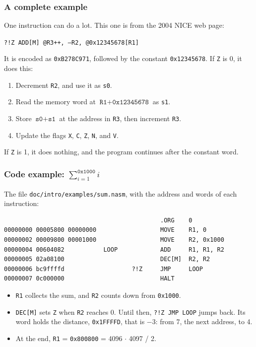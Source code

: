 \documentclass{beamer}
\newcommand{\code}[1]{\texttt{#1}}
\begin{document}
   \begin{frame}
    \frametitle{A complete example}
    One instruction can do a lot. This one is from the 2004 NICE web page:
    \begin{center}
     \code{?!Z ADD[M] @R3++, --R2, @0x12345678[R1]}
    \end{center}
    It is encoded as \code{0xB278C971}, followed by the constant
    \code{0x12345678}. If \code{Z} is 0, it does this:
    \begin{enumerate}
     \item Decrement \code{R2}, and use it as \code{s0}.
     \item Read the memory word at $\code{R1} + \code{0x12345678}$ as
      \code{s1}.
     \item Store $\code{s0} + \code{s1}$ at the address in \code{R3}, then
      increment \code{R3}.
     \item Update the flags \code{X}, \code{C}, \code{Z}, \code{N}, and
      \code{V}.
    \end{enumerate}
    If \code{Z} is 1, it does nothing, and the program continues after the
    constant word.
   \end{frame}
%
  \begin{frame}[fragile]
   \frametitle{Code example: {\scriptsize$\sum_{i=1}^{\mathtt{0x1000}}i$}}
   The file \code{doc/intro/examples/sum.nasm}, with the address and words
   of each instruction:
   {\scriptsize
   \begin{verbatim}
                                            .ORG    0
00000000 00005800 00000000                  MOVE    R1, 0
00000002 00009800 00001000                  MOVE    R2, 0x1000
00000004 00604082           LOOP            ADD     R1, R1, R2
00000005 02a08100                           DEC[M]  R2, R2
00000006 bc9ffffd                   ?!Z     JMP     LOOP
00000007 0c000000                           HALT
   \end{verbatim}
   }
   \begin{itemize}
    \item \code{R1} collects the sum, and \code{R2} counts down from
     \code{0x1000}.
    \item \code{DEC[M]} sets \code{Z} when \code{R2} reaches 0. Until
     then, \code{?!Z JMP LOOP} jumps back. Its word holds the distance,
     \code{0x1FFFFD}, that is $-3$: from 7, the next address, to 4.
    \item At the end, \code{R1} = \code{0x800800} = 4096 $\cdot$ 4097 / 2.
   \end{itemize}
  \end{frame}
\end{document}
